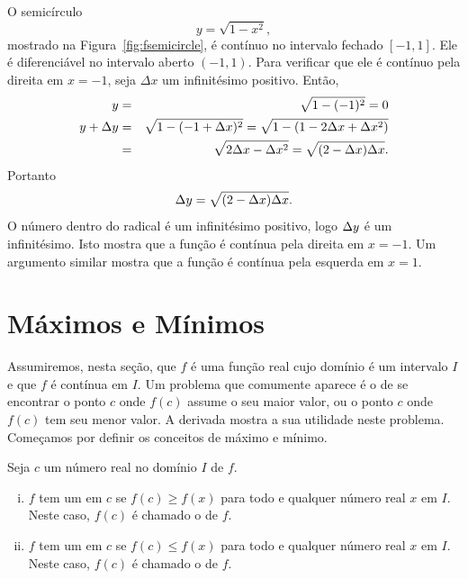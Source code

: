 \begin{example}
  O semicírculo
  $$
    y = \sqrt{1 - x^2},
  $$
  mostrado na Figura~\ref{fig:fsemicircle}, é contínuo no intervalo fechado
  $[-1, 1]$. Ele é diferenciável no intervalo aberto $(-1, 1)$. Para
  verificar que ele é contínuo pela direita em $x = -1$, seja $\Delta x$
  um infinitésimo positivo. Então,
  \begin{eqnarray*}
    y & = & \sqrt{1 - (-1)^2} = 0 \\
    y + \Delta y & = & \sqrt{1 - (-1 + \Delta x)^2} = \sqrt{1 - (1 - 2\Delta x + \Delta x^2)} \\
    & = & \sqrt{2 \Delta x - \Delta x^2} = \sqrt{(2 - \Delta x)\Delta x}.
  \end{eqnarray*}
  Portanto
  $$
    \Delta y = \sqrt{(2-\Delta x)\Delta x}.
  $$
  O número dentro do radical é um infinitésimo positivo, logo $\Delta y$ é um
  infinitésimo. Isto mostra que a função é contínua pela direita em
  $x = -1$. Um argumento similar mostra que a função é contínua pela
  esquerda em $x = 1$.
\end{example}


\begin{sectionproblems}
\end{sectionproblems}

\section{Máximos e Mínimos}
\label{sec:maxmin}

Assumiremos, nesta seção, que $f$ é uma função real cujo domínio é um intervalo
$I$ e que $f$ é contínua em $I$. Um problema que comumente aparece é o de se
encontrar o ponto $c$ onde $f(c)$ assume o seu maior valor, ou o ponto $c$
onde $f(c)$ tem seu menor valor. A derivada mostra a sua utilidade neste
problema. Começamos por definir os conceitos de máximo e mínimo.

\begin{definition*}
  Seja $c$ um número real no domínio $I$ de $f$.
  \begin{enumerate}[(i)]
  \item $f$ tem um  em $c$ se $f(c) \ge f(x)$ para todo
        e qualquer número real $x$ em $I$. Neste caso, $f(c)$ é chamado
        o  de $f$.
  \item $f$ tem um  em $c$ se $f(c) \le f(x)$ para todo
        e qualquer número real $x$ em $I$. Neste caso, $f(c)$ é chamado
        o  de $f$.
  \end{enumerate}
\end{definition*}


